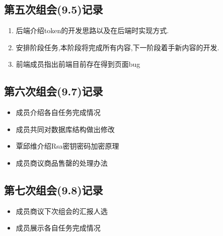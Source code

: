 \subsection{第五次组会(9.5)记录}
 \begin{enumerate}
     \item 后端介绍token的开发思路以及在后端时实现方式.
     \item 安排阶段任务,本阶段将完成所有内容,下一阶段着手新内容的开发.
     \item 前端成员指出前端目前存在得到页面bug
 \end{enumerate}

\subsection{第六次组会(9.7)记录}
\begin{itemize}
    \item 成员介绍各自任务完成情况
    \item 成员共同对数据库结构做出修改
    \item 覃邱维介绍Rsa密钥密码加密原理
    \item 成员商议商品售罄的处理办法
\end{itemize}

\subsection{第七次组会(9.8)记录}
\begin{itemize}
    \item 成员商议下次组会的汇报人选
    \item 成员展示各自任务完成情况
\end{itemize}




